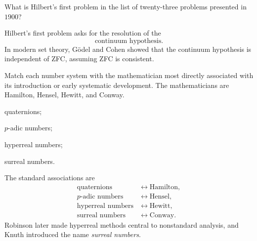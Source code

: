     \begin{expectedproblem}
        What is Hilbert's first problem in the list of twenty-three problems
        presented in $1900$?
    \end{expectedproblem}

    \begin{solution}
        Hilbert's first problem asks for the resolution of the
        \[
            \boxed{\text{continuum hypothesis}}.
        \]
        In modern set theory, Gödel and Cohen showed that the continuum
        hypothesis is independent of ZFC, assuming ZFC is consistent.
    \end{solution}

    \begin{expectedproblem}
        Match each number system with the mathematician most directly
        associated with its introduction or early systematic development. The
        mathematicians are Hamilton, Hensel, Hewitt, and Conway.
        \begin{problemchoices}
            \item quaternions;
            \item $p$-adic numbers;
            \item hyperreal numbers;
            \item surreal numbers.
        \end{problemchoices}
    \end{expectedproblem}

    \begin{solution}
        The standard associations are
        \[
            \boxed{
                \begin{aligned}
                    \text{quaternions}
                    &\longleftrightarrow \text{Hamilton},\\
                    p\text{-adic numbers}
                    &\longleftrightarrow \text{Hensel},\\
                    \text{hyperreal numbers}
                    &\longleftrightarrow \text{Hewitt},\\
                    \text{surreal numbers}
                    &\longleftrightarrow \text{Conway}.
                \end{aligned}
            }
        \]
        Robinson later made hyperreal methods central to nonstandard analysis,
        and Knuth introduced the name \emph{surreal numbers}.
    \end{solution}

